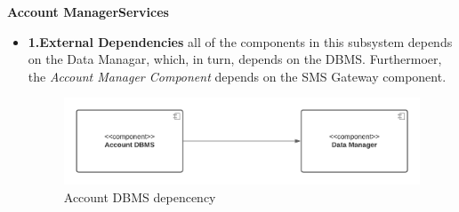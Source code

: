 \textbf{Account ManagerServices}
\begin{itemize}
    \item \textbf{1.External Dependencies}
     all of the components in this subsystem depends on the Data Managar, which, in turn, depends on the DBMS. Furthermoer, the \textit{Account Manager Component}  depends on the SMS Gateway component.
    \begin{figure}[h!]
        \centering
        \includegraphics[width=.8\textwidth]{Images/TestDiagram/Account/ExternalDependenciesDBMS.png}
        \caption{\label{fig:AccountExternalDepDBMS}{Account DBMS depencency}}
    \end{figure}
    \FloatBarrier  
    

\end{itemize}
